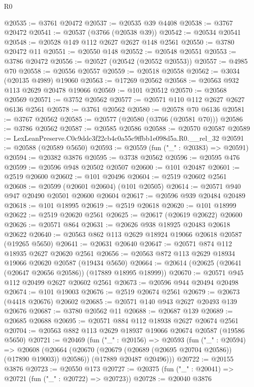 \begin{lexlean}{R0}
\begin{coremodule}
@20535 := @3761 @20472
@20537 := @20535 @39 @4408
@20538 := @3767 @20472
@20541 := @20537 (@3766 (@20538 @39))
@20542 := @20534 @20541
@20548 := @20528 @149 @112 @2627 @2627 @148 @2561
@20550 := @3780 @20472 @11
@20551 := @20550 @148
@20552 := @20548 @20551
@20553 := @3786 @20472
@20556 := @20527 (@20542 (@20552 @20553))
@20557 := @4985 @70
@20558 := @20556 @20557
@20559 := @20518 @20558
@20562 := @3034 (@20135 @4989) @19060
@20563 := @17269 @20562
@20568 := @20563 @932 @113 @2629 @20478 @19066
@20569 := @101 @20512
@20570 := @20568 @20569
@20571 := @3752 @20562
@20577 := @20571 @110 @112 @2627 @2627 @6136 @2561
@20578 := @3761 @20562
@20580 := @20578 @70 @6136
@20581 := @3767 @20562
@20585 := @20577 (@20580 (@3766 (@20581 @70)))
@20586 := @3786 @20562
@20587 := @20585 @20586
@20588 := @20570 @20587
@20589 := LexLeanPreserve.C0c9ddc3f22cb4c0a55c9ffbb1e098d5a.R0.__rel_32
@20591 := @20588 (@20589 @5650)
@20593 := @20559 (fun ("_" : @20383) => @20591)
@20594 := @20382 @3876
@20595 := @3738 @20562
@20596 := @20595 @476
@20599 := @20596 @948 @20502 @20507
@20600 := @101 @20487
@20601 := @2519 @20600
@20602 := @101 @20496
@20604 := @2519 @20602 @2561
@20608 := @20599 (@20601 @20604) (@101 @20505)
@20614 := @20571 @940 @947 @20490 @20501 @20600 @20604
@20617 := @20596 @939 @20484 @20489
@20618 := @101 @18995
@20619 := @2519 @20618
@20620 := @101 @18999
@20622 := @2519 @20620 @2561
@20625 := @20617 (@20619 @20622) @20600
@20626 := @20571 @864
@20631 := @20626 @938 @18925 @20483 @20618 @20622
@20640 := @20563 @862 @113 @2629 @18924 @19066 @20618 @20587 (@19265 @5650)
@20641 := @20631 @20640
@20647 := @20571 @874 @112 @18935 @2627 @20620 @2561
@20656 := @20563 @872 @113 @2629 @18934 @19066 @20620 @20587 (@19434 @5650)
@20664 := @20614 (@20625 (@20641 (@20647 @20656 @20586)) (@17889 @18995 @18999))
@20670 := @20571 @945 @112 @20499 @2627 @20602 @2561
@20673 := @20596 @944 @20494 @20498
@20674 := @101 @19003
@20676 := @2519 @20674 @2561
@20679 := @20673 (@4418 @20676) @20602
@20685 := @20571 @140 @943 @2627 @20493 @139 @20676
@20687 := @3780 @20562 @11
@20688 := @20687 @139
@20689 := @20685 @20688
@20695 := @20571 @884 @112 @18938 @2627 @20674 @2561
@20704 := @20563 @882 @113 @2629 @18937 @19066 @20674 @20587 (@19586 @5650)
@20721 := @20469
    (fun ("_" : @20156) =>
    @20593
      (fun ("_" : @20594) =>
      @20608
        (@20664 (@20670 (@20679 (@20689 (@20695 @20704 @20586)) (@17890 @19003)) @20586))
        (@17889 @20487 @20496)))
@20722 := @20155 @3876
@20723 := @20550 @173
@20727 := @20375 (fun ("_" : @20041) => @20721 (fun ("_" : @20722) => @20723))
@20728 := @20040 @3876

\end{coremodule}
\end{lexlean}

